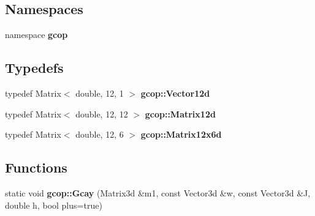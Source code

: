 \subsection*{\-Namespaces}
\begin{DoxyCompactItemize}
\item 
namespace {\bf gcop}
\end{DoxyCompactItemize}
\subsection*{\-Typedefs}
\begin{DoxyCompactItemize}
\item 
typedef \-Matrix$<$ double, 12, 1 $>$ {\bf gcop\-::\-Vector12d}
\item 
typedef \-Matrix$<$ double, 12, 12 $>$ {\bf gcop\-::\-Matrix12d}
\item 
typedef \-Matrix$<$ double, 12, 6 $>$ {\bf gcop\-::\-Matrix12x6d}
\end{DoxyCompactItemize}
\subsection*{\-Functions}
\begin{DoxyCompactItemize}
\item 
static void {\bf gcop\-::\-Gcay} (\-Matrix3d \&m1, const \-Vector3d \&w, const \-Vector3d \&\-J, double h, bool plus=true)
\end{DoxyCompactItemize}
